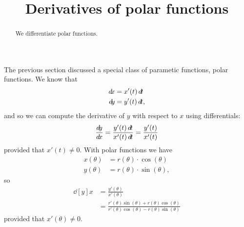 \documentclass{ximera}
\title[Dig-In:]{Derivatives of polar functions}
\begin{document}
\begin{abstract}
  We differentiate polar functions.
\end{abstract}
\maketitle

The previous section discussed a special class of parametic functions,
polar functions.  We know that
\begin{align*}
  \d x &= x'(t) \d t\\
  \d y &= y'(t) \d t,
\end{align*}
and so we can compute the derivative of $y$ with respect to $x$ using
differentials:
\[
\frac{\d y}{\d x} = \frac{y'(t) \d t}{x'(t) \d t} = \frac{y'(t)}{x'(t)}
\]
provided that $x'(t) \ne 0$.  With polar functions we have
\begin{align*}
  x(\theta) &= r(\theta) \cdot \cos(\theta)\\
  y(\theta) &= r(\theta) \cdot \sin(\theta),
\end{align*}
so
\begin{align*}
\dd[y]{x} &= \frac{y'(\theta)}{x'(\theta)} \\
&= \frac{r'(\theta)\sin(\theta)+r(\theta)\cos(\theta)}{r'(\theta)\cos(\theta)-r(\theta)\sin(\theta)}
\end{align*}
provided that $x'(\theta)\ne 0$.
\end{document}
